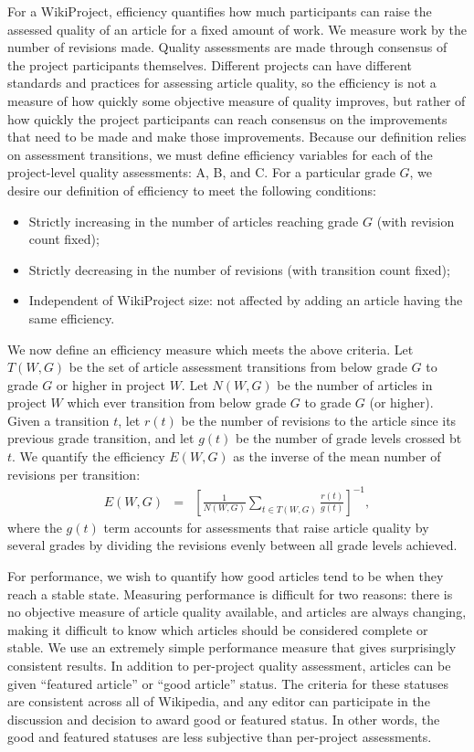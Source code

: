 \documentclass[letterpaper,twocolumn,10pt]{article}
\newcommand{\beq}{\begin{eqnarray}}
\newcommand{\eeq}{\end{eqnarray}}
\newcommand{\+}{\phantom{-}}
\begin{document}
For a WikiProject, efficiency quantifies how much participants can raise the
assessed quality of an article for a fixed amount of work.
We measure work by the number of revisions made.
Quality assessments are made through consensus of the project participants themselves.
Different projects can have different standards and practices for assessing article quality,
so the efficiency is not a measure of how quickly some objective measure of quality improves,
but rather of how quickly the project participants can reach consensus on the improvements that
need to be made and make those improvements.
Because our definition relies on assessment transitions,
we must define efficiency variables for
each of the project-level quality assessments: A, B, and C.
For a particular grade $G$,
we desire our definition of efficiency to meet the following conditions:
\begin{itemize}
\setlength\itemsep{0pt}
\item{Strictly increasing in the number of articles reaching grade $G$ (with revision count fixed);}
\item{Strictly decreasing in the number of revisions (with transition count fixed);}
\item{Independent of WikiProject size: not affected by adding an article having the same efficiency.}
\end{itemize}

We now define an efficiency measure which meets the above criteria.
Let $T(W,G)$ be the set of article assessment transitions from below grade $G$
to grade $G$ or higher in project $W$.
Let $N(W,G)$ be the number of articles in project $W$ which ever transition
from below grade $G$ to grade $G$ (or higher).
Given a transition $t$,
let $r(t)$ be the number of revisions to the article
since its previous grade transition,
and let $g(t)$ be the number of grade levels crossed bt $t$.
We quantify the efficiency $E(W,G)$ as the inverse of the mean number of revisions
per transition:
\beq
E(W,G)
&=&
\left[
\frac{1}{
N(W,G)
}
\sum_{t \in T(W,G)} \frac{r(t)}{g(t)}
\right]^{-1},
\eeq
where the $g(t)$ term accounts for assessments that raise article quality by
several grades by
dividing the revisions evenly between all grade levels achieved.

For performance, we wish to quantify how good articles tend to be when they reach a stable state.
Measuring performance is difficult for two reasons:
there is no objective measure of article quality available,
and articles are always changing, making it difficult to know which articles should be considered
complete or stable.
We use an extremely simple performance measure that gives surprisingly consistent results.
In addition to per-project quality assessment, articles can be given ``featured article'' or
``good article'' status.
The criteria for these statuses are consistent across all of Wikipedia,
and any editor can participate in the discussion and decision to award good or featured
status.
In other words, the good and featured statuses are less subjective than per-project assessments.
\end{document}

